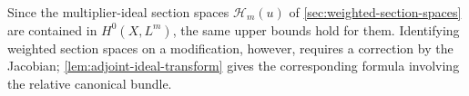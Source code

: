 Since the multiplier-ideal section spaces $\mathcal H_m(u)$ of \cref{sec:weighted-section-spaces} are contained in $H^0(X,L^m)$, the same upper bounds hold for them. Identifying weighted section spaces on a modification, however, requires a correction by the Jacobian; \cref{lem:adjoint-ideal-transform} gives the corresponding formula involving the relative canonical bundle.
